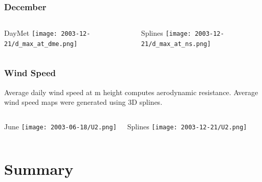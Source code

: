 \documentclass{beamer}
\begin{document}
\begin{frame}
  \frametitle{December}
  \begin{columns}
    \begin{block}{DayMet}
      \texttt{[image: 2003-12-21/d\_max\_at\_dme.png]}
    \end{block}
    \begin{block}{Splines}
      \texttt{[image: 2003-12-21/d\_max\_at\_ns.png]}
    \end{block}
  \end{columns}
\end{frame}


\begin{frame}
  \frametitle{Wind Speed}
  \begin{block}{}
    Average daily wind speed at \unit[2]{m} height computes
    aerodynamic resistance.  Average wind speed maps were generated
    using 3D splines.
  \end{block}

  \begin{columns}
    \begin{block}{June}
      \texttt{[image: 2003-06-18/U2.png]}
    \end{block}
    \begin{block}{Splines}
      \texttt{[image: 2003-12-21/U2.png]}
    \end{block}
  \end{columns}
\end{frame}


\section{Summary}
\end{document}
